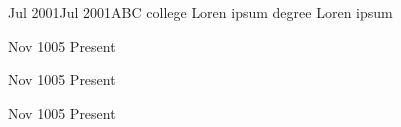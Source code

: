 
\usepackage{blindtext}  
\usepackage{lipsum}

\def\lrand{\lipsum[-]}
\def\firstname{Loren}
\def\lastname{Ipsum}
\def\email{loren.ipsum@gmail.com}
\def\linkedin{linkedin.com/in/lorenipsum}
\def\github{github.com/lorenipsum}
\def\phone{+1 (911) 113-9126}

\def\jDescribeBegin{\begin{description}}
\def\jDescribeEnd{\end{description}}

\def\profileSummary{
\section{Career summary so far}
\blindtext
}

\def\skills{
\jDescribeBegin
    \item[Technical] List computer software and programming languages 
    \item[Language] List foreign languages and your level of fluency
    \item[Laboratory] List scientific / research lab techniques or tools [If Applicable]
    \item[Interests] List activities you enjoy that may spark interview conversation
\jDescribeEnd

}

\def\achievements{
    \jbegin
        \jitem {\lrand[1]}
        \jitem {\lrand[2]}
        \jitem {\lrand[1]}
        \jitem {\lrand[2]}
    \jend
}

{Jul 2001}{Jul 2001}{ABC college }
{Loren ipsum degree}
{Loren ipsum}

{Nov 1005}
{Present}
{\lrand[1]}
{\lrand[1]}
{\lrand[1]}
{
\jbegin
    \jitem{\lrand[2]}
    \jitem{\lrand[1]}
    \jitem{\lrand[3]}
    \jitem{\lrand[5]}
\jend
}


{Nov 1005}
{Present}
{\lrand[1]}
{\lrand[1]}
{\lrand[1]}
{
\jbegin
    \jitem{\lrand[2]}
    \jitem{\lrand[1]}
    \jitem{\lrand[7]}
\jend
}


{Nov 1005}
{Present}
{\lrand[1]}
{\lrand[1]}
{\lrand[1]}
{
\jbegin
    \jitem{\lrand[2]}
    \jitem{\lrand[1]}
    \jitem{\lrand[7]}
\jend
}

